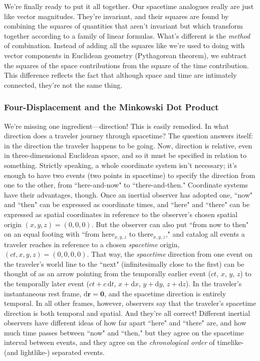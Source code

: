 \documentclass[12pt]{article}
\renewcommand{\vv}[1]{\mathbf{#1}}
\newcommand{\dd}[1]{\mathrm{d}#1}
\begin{document}
We're finally ready to put it all together. Our spacetime analogues really are just like vector magnitudes. They're invariant, and their squares are found by combining the squares of quantities that aren't invariant but which transform together according to a family of linear formulas. What's different is the \emph{method} of combination. Instead of adding all the squares like we're used to doing with vector components in Euclidean geometry (Pythagorean theorem), we subtract the squares of the space contributions from the square of the time contribution. This difference reflects the fact that although space and time are intimately connected, they're not the same thing.


\subsubsection{Four-Displacement and the Minkowski Dot Product}\label{sssec:fdi}

We're missing one ingredient---direction! This is easily remedied. In what direction does a traveler journey through spacetime? The question answers itself: in the direction the traveler happens to be going. Now, direction is relative, even in three-dimensional Euclidean space, and so it must be specified in relation to something. Strictly speaking, a whole coordinate system isn't necessary; it's enough to have two events (two points in spacetime) to specify the direction from one to the other, from ``here-and-now" to ``there-and-then." Coordinate systems have their advantages, though. Once an inertial observer has adopted one, ``now" and ``then" can be expressed as coordinate times, and ``here" and ``there" can be expressed as spatial coordinates in reference to the observer's chosen spatial origin $(x,y,z)=(0,0,0)$. But the observer can also put ``from now to then" on an equal footing with ``from here$_{x, y, z}$ to there$_{x, y, z}$," and catalog all events a traveler reaches in reference to a chosen \emph{spacetime} origin, $(ct,x,y,z)=(0,0,0,0)$. That way, the \emph{spacetime} direction from one event on the traveler's world line to the ``next" (infinitesimally close to the first) can be thought of as an arrow pointing from the temporally earlier event ($ct$, $x$, $y$, $z$) to the temporally later event ($ct + c \, \dd t$, $x + \dd x$, $y + \dd y$, $z + \dd z$). In the traveler's instantaneous rest frame, $\dd \vv r = \vv 0$, and the spacetime direction is entirely temporal. In all other frames, however, observers say that the traveler's spacetime direction is both temporal and spatial. And they're all correct! Different inertial observers have different ideas of how far apart ``here" and ``there" are, and how much time passes between ``now" and ``then," but they agree on the spacetime interval between events, and they agree on the \emph{chronological order} of timelike- (and lightlike-) separated events.
\end{document}
